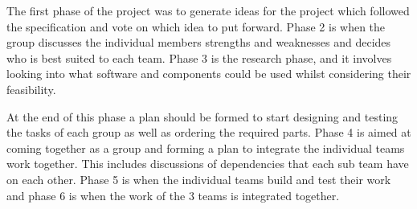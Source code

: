 The first phase of the project was to generate ideas for the project which followed the specification and vote on which idea to put forward.
Phase 2 is when the group discusses the individual members strengths and weaknesses and decides who is best suited to each team.
Phase 3 is the research phase, and it involves looking into what software and components could be used whilst considering their feasibility.

At the end of this phase a plan should be formed to start designing and testing the tasks of each group as well as ordering the required parts.
Phase 4 is aimed at coming together as a group and forming a plan to integrate the individual teams work together.
This includes discussions of dependencies that each sub team have on each other.
Phase 5 is when the individual teams build and test their work and phase 6 is when the work of the 3 teams is integrated together.